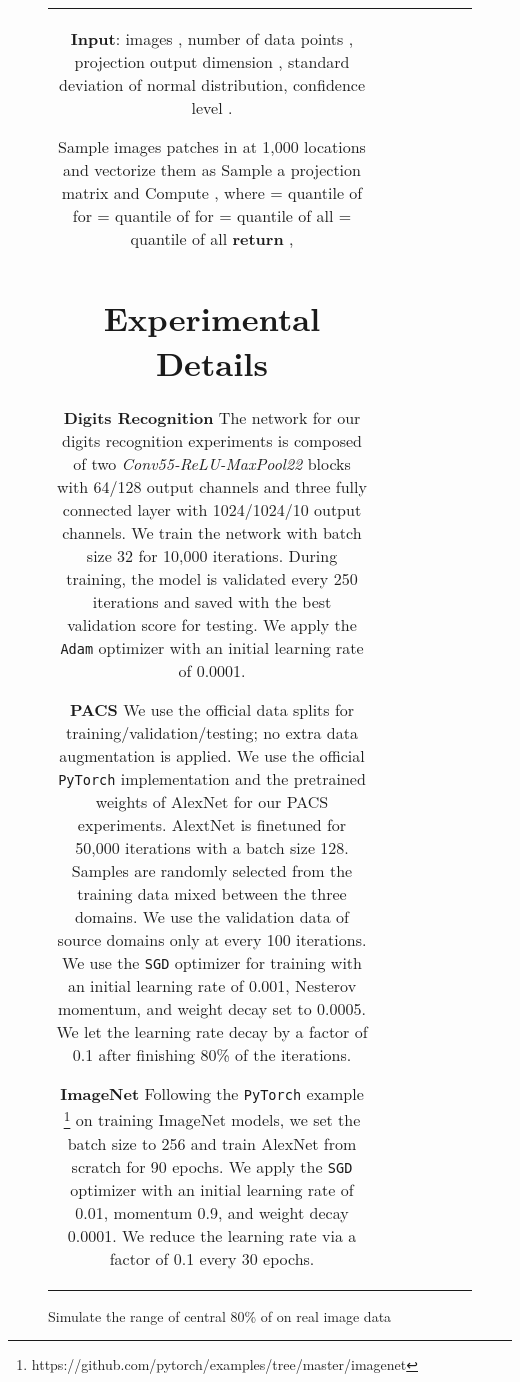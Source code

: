 \documentclass{article} \usepackage{iclr2021_conference,times}
\begin{document}
\begin{figure}[t]
\begin{center}
\begin{adjustbox}{max width=\textwidth}
\begin{tabular}{ccccccc}
\begin{algorithm}[h]
	\small
	\caption{Simulate the range of central 80\% of  on real image data}
	\label{algo:simulation}
	\begin{algorithmic}[1]
		\State \textbf{Input}:  images , number of data points , projection output dimension , standard deviation  of normal distribution, confidence level .


		\For {}
		\State Sample images patches in  at 1,000 locations and vectorize them as 
		\State Sample a projection matrix  and 
		\For {}
		\For {}
		\State Compute , where 
		\EndFor	
		\EndFor
		\State  =  quantile of  for  
		\State 	=  quantile of  for  \Comment{Get the central 80\% of  in each image}
		\EndFor	
		\State  =  quantile of all  
		\State  =  quantile of all 
		\Comment{Get the  confident bound for  and }
		\State \textbf{return} , 		 
	\end{algorithmic}
\end{algorithm}


\section{Experimental Details}
\label{exp_detail}


\textbf{Digits Recognition} The network for our digits recognition experiments is composed of two \emph{Conv55-ReLU-MaxPool22} blocks with 64/128 output channels and three fully connected layer with 1024/1024/10 output channels. We train the network with batch size 32 for 10,000 iterations. During training, the model is validated every 250 iterations and saved with the best validation score for testing. We apply the \texttt{Adam} optimizer with an initial learning rate of 0.0001.   

\textbf{PACS} We use the official data splits for training/validation/testing; no extra data augmentation is applied. We use the official \texttt{PyTorch} implementation and the pretrained weights of AlexNet for our PACS experiments. AlextNet is finetuned for 50,000 iterations with a batch size 128. Samples are randomly selected from the training data mixed between the three domains. We use the validation data of  source domains only at every 100 iterations. We use the \texttt{SGD} optimizer for training with an initial learning rate of 0.001, Nesterov momentum, and weight decay set to 0.0005. We let the learning rate decay by a factor of 0.1 after finishing 80\% of the iterations.

\textbf{ImageNet} Following the \texttt{PyTorch} example \footnote{https://github.com/pytorch/examples/tree/master/imagenet} on training ImageNet models, we set the batch size to 256 and train AlexNet from scratch for 90 epochs. We apply the \texttt{SGD} optimizer with an initial learning rate of 0.01, momentum 0.9, and weight decay 0.0001. We reduce the learning rate via a factor of 0.1 every 30 epochs.


\end{tabular}
\end{adjustbox}
\end{center}
\end{figure}
\end{document}
